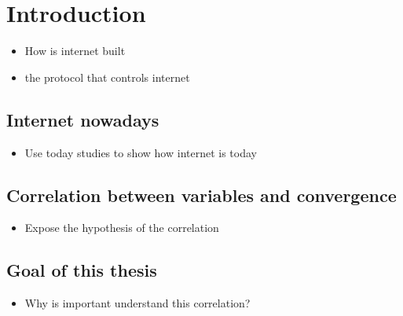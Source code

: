 \chapter{Introduction}
\label{cha:introduction}

\begin{itemize}
    \item How is internet built
    \item the protocol that controls internet
\end{itemize}

\section{Internet nowadays}
\label{sec:internet_today}

\begin{itemize}
    \item Use today studies to show how internet is today
\end{itemize}

\section{Correlation between variables and convergence}
\label{sec:bgp_correlations}

\begin{itemize}
    \item Expose the hypothesis of the correlation
\end{itemize}

\section{Goal of this thesis}
\label{sec:thesis_goal}

\begin{itemize}
    \item Why is important understand this correlation?
\end{itemize}